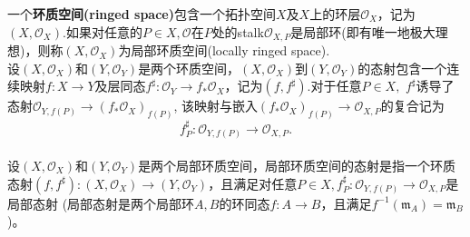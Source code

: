 \documentclass[UTF8]{article}
\begin{document}
一个\textbf{环质空间(ringed space)}包含一个拓扑空间$X$及$X$上的环层$\mathcal{O}_{X}$，记为$(X,\mathcal{O}_{X}).$如果对任意的$P\in X,$$\mathcal{O}$在$P$处的stalk$\mathcal{O}_{X,P}$是局部环(即有唯一地极大理想)，则称$(X,\mathcal{O}_{X})$为局部环质空间(locally ringed space).\\
设$(X,\mathcal{O}_{X})$和$(Y,\mathcal{O}_{Y})$是两个环质空间，$(X,\mathcal{O}_{X})$到$(Y,\mathcal{O}_{Y})$的态射包含一个连续映射$f:X\rightarrow Y$及层同态$f^{\sharp}:\mathcal{O}_{Y}\rightarrow f_{*}\mathcal{O}_{X}$，记为$(f,f^{\sharp}).$对于任意$P\in X,$ $f^{\sharp}$诱导了态射$\mathcal{O}_{Y,f(P)}\rightarrow (f_{*}\mathcal{O}_{X})_{f(P)}$,
该映射与嵌入$(f_{*}\mathcal{O}_{X})_{f(P)}\rightarrow \mathcal{O}_{X,P}$的复合记为
$$f^{\sharp}_{P}:\mathcal{O}_{Y,f(P)}\rightarrow \mathcal{O}_{X,P}.$$\\
设$(X,\mathcal{O}_{X})$和$(Y,\mathcal{O}_{Y})$是两个局部环质空间，局部环质空间的态射是指一个环质态射$(f,f^{\sharp}):(X,\mathcal{O}_{X})\rightarrow (Y,\mathcal{O}_{Y})$，且满足对任意$P\in X,f^{\sharp}_{P}:\mathcal{O}_{Y,f(P)}\rightarrow \mathcal{O}_{X,P}$是局部态射
(局部态射是两个局部环$A,B$的环同态$f:A\rightarrow B$，且满足$f^{-1}(\mathfrak{m}_{A})=\mathfrak{m}_{B}$)。\\
\end{document}
